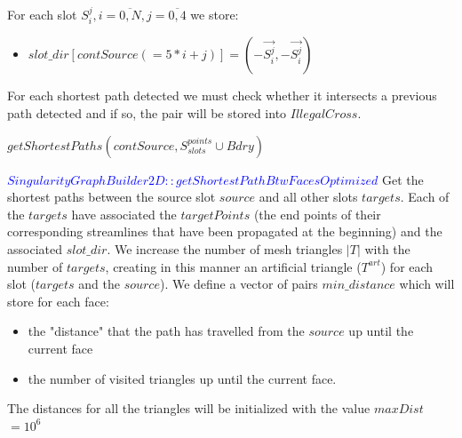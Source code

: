 \documentclass[a4paper]{report}
\begin{document}
{{For each slot $S_i^j, i = \overline{0,N}, j = \overline{0,4}$ we store:
\begin{itemize}
\item $slot\_dir[contSource(=5*i+j)] = (-\overrightarrow{S_i^j }, -\overrightarrow{S_i^j })$
\end{itemize}

For each shortest path detected we must check whether it intersects a previous path detected and if so, the pair will be stored into \textcolor{myGreen}{$IllegalCross$}.
\begin{algorithmic}[1]
		\State $getShortestPaths(contSource, S_{slots}^{points} \cup Bdry)$
		
		\EndIf
		\EndFor
		\EndFor
		\end{algorithmic}	

\textcolor{blue}{$SingularityGraphBuilder2D::getShortestPathBtwFacesOptimized$}
		Get the shortest paths between the source slot \textcolor{myGreen}{$source$} and all other slots \textcolor{myGreen}{$targets$}.
		\newline
		Each of the \textcolor{myGreen}{$targets$} have associated the \textcolor{myGreen}{$targetPoints$} (the end points of their corresponding streamlines that have been propagated at the beginning) and the associated \textcolor{myGreen}{$slot\_dir$}. 
		\newline
		We increase the number of mesh triangles $|T|$ with the number of \textcolor{myGreen}{$targets$}, creating in this manner an artificial triangle ($T^{art}$) for each slot (\textcolor{myGreen}{$targets$} and the \textcolor{myGreen}{$source$}).
		\newline
		We define a vector of pairs \textcolor{myGreen}{$min\_distance$} which will store for each face:
		\begin{itemize} 
		\item  the "distance" that the path has travelled from the \textcolor{myGreen}{$source$} up until the current face  
		\item the number of visited triangles up until the current face.
		\end{itemize}		
		
		The distances for all the triangles will be initialized with the value 
		\textcolor{myGreen}{$maxDist$}$ = 10^6$
		
}}
\end{document}

